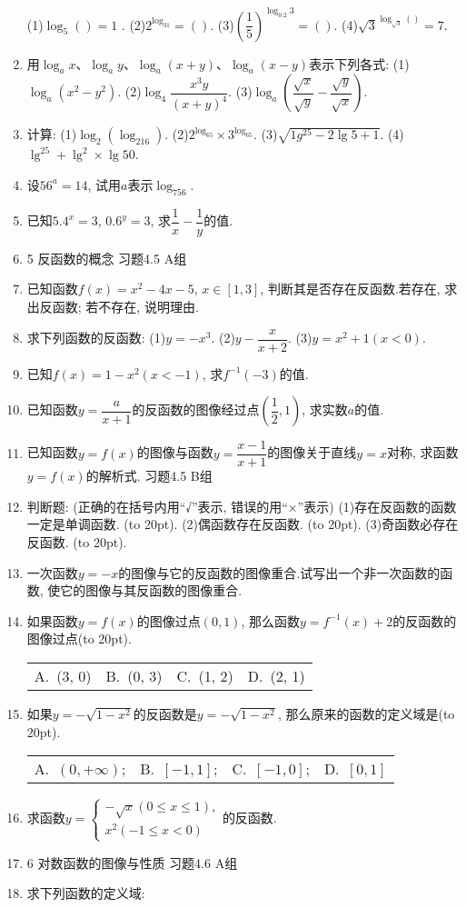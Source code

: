\documentclass[10pt,a4paper]{article}
\newcommand{\bracket}[1]{(\hbox to #1pt{})}
\newcommand{\fourch}[4]{\par\begin{tabular}{p{.23\textwidth}p{.23\textwidth}p{.23\textwidth}p{.23\textwidth}}
A.~#1 &B.~#2& C.~#3& D.~#4
\end{tabular}}
\begin{document}
\begin{enumerate}[1.]
(1)$\log _5()=1$	.					(2)$2^{\log _31}=()$.
(3)$(\dfrac 15)^{\log _{0.2}3}=()$.					(4)$\sqrt 3^{\log _{\sqrt 3}()}=7$.
\item 用$\log _ax$、$\log _ay$、$\log _a(x+y)$、$\log _a(x-y)$表示下列各式:
(1)$\log _a(x^2-y^2)$.					(2)$\log _4\dfrac{{x^3}y}{{{(x+y)}^4}}$.
(3)$\log _a(\dfrac{\sqrt x}{\sqrt y}-\dfrac{\sqrt y}{\sqrt x})$.
\item 计算:
(1)$\log _2(\log _216)$.					(2)$2^{\log _65}\times 3^{\log _65}$.
(3)$\sqrt {1g^25-2\lg 5+1}$.				(4)$\lg ^25+\lg ^2\times \lg 50$.
\item 设$56^a=14$, 试用$a$表示$\log _756$.
\item 已知$5.4^x=3$, $0.6^y=3$, 求$\dfrac 1x-\dfrac 1y$的值.
\item 5  反函数的概念
习题4.5  A组
\item 已知函数$f(x)=x^2-4x-5$, $x\in [1,3]$, 判断其是否存在反函数.若存在, 求出反函数; 若不存在, 说明理由.
\item 求下列函数的反函数:
(1)$y=-x^3$.						(2)$y-\dfrac x{x+2}$.
(3)$y=x^2+1(x<0)$.
\item 已知$f(x)=1-x^2(x<-1)$, 求$f^{-1}(-3)$的值.
\item 已知函数$y=\dfrac a{x+1}$的反函数的图像经过点$(\dfrac 12,1)$, 求实数$a$的值.
\item 已知函数$y=f(x)$的图像与函数$y=\dfrac{x-1}{x+1}$的图像关于直线$y=x$对称, 求函数$y=f(x)$的解析式.
习题4.5  B组
\item 判断题: (正确的在括号内用``√''表示, 错误的用``×''表示)
(1)存在反函数的函数一定是单调函数.				\bracket{20}.
(2)偶函数存在反函数.							\bracket{20}.
(3)奇函数必存在反函数.							\bracket{20}.
\item 一次函数$y=-x$的图像与它的反函数的图像重合.试写出一个非一次函数的函数, 使它的图像与其反函数的图像重合.
\item 如果函数$y=f(x)$的图像过点$(0, 1)$, 那么函数$y=f^{-1}(x)+2$的反函数的图像过点\bracket{20}.
\fourch{(3, 0)}{(0, 3)}{(1, 2)}{(2, 1)}
\item 如果$y=-\sqrt {1-x^2}$的反函数是$y=-\sqrt {1-x^2}$, 那么原来的函数的定义域是\bracket{20}.
\fourch{$(0,+\infty)$;}{$[-1,1]$;}{$[-1,0]$;}{$[0,1]$}
\item 求函数$y=\begin{cases} -\sqrt x(0\le x\le 1), \\ x^2(-1\le x<0) \end{cases}$的反函数.
\item 6  对数函数的图像与性质
习题4.6  A组
\item 求下列函数的定义域:

\end{enumerate}
\end{document}
